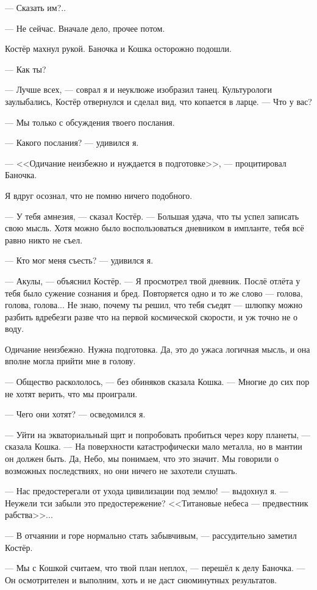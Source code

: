 --- Сказать им?..

--- Не сейчас.
Вначале дело, прочее потом.

Костёр махнул рукой. Баночка и Кошка осторожно подошли.

--- Как ты?

--- Лучше всех, --- соврал я и неуклюже изобразил танец.
Культурологи заулыбались, Костёр отвернулся и сделал вид, что копается в ларце.
--- Что у вас?

--- Мы только с обсуждения твоего послания.

--- Какого послания? --- удивился я.

--- <<Одичание неизбежно и нуждается в подготовке>>, --- процитировал Баночка.

Я вдруг осознал, что не помню ничего подобного.

--- У тебя амнезия, --- сказал Костёр.
--- Большая удача, что ты успел записать свою мысль.
Хотя можно было воспользоваться дневником в импланте, тебя всё равно никто не съел.

--- Кто мог меня съесть? --- удивился я.

--- Акулы, --- объяснил Костёр.
--- Я просмотрел твой дневник.
Послё отлёта у тебя было сужение сознания и бред.
Повторяется одно и то же слово --- голова, голова, голова...
Не знаю, почему ты решил, что тебя съедят --- шлюпку можно разбить вдребезги разве что на первой космической скорости, и уж точно не о воду.

Одичание неизбежно.
Нужна подготовка.
Да, это до ужаса логичная мысль, и она вполне могла прийти мне в голову.

--- Общество раскололось, --- без обиняков сказала Кошка.
--- Многие до сих пор не хотят верить, что мы проиграли.

--- Чего они хотят? --- осведомился я.

--- Уйти на экваториальный щит и попробовать пробиться через кору планеты, --- сказала Кошка.
--- На поверхности катастрофически мало металла, но в мантии он должен быть.
Да, Небо, мы понимаем, что это значит.
Мы говорили о возможных последствиях, но они ничего не захотели слушать.

--- Нас предостерегали от ухода цивилизации под землю! --- выдохнул я.
--- Неужели тси забыли это предостережение?
<<Титановые небеса --- предвестник рабства>>...

--- В отчаянии и горе нормально стать забывчивым, --- рассудительно заметил Костёр.

--- Мы с Кошкой считаем, что твой план неплох, --- перешёл к делу Баночка.
--- Он осмотрителен и выполним, хоть и не даст сиюминутных результатов.

